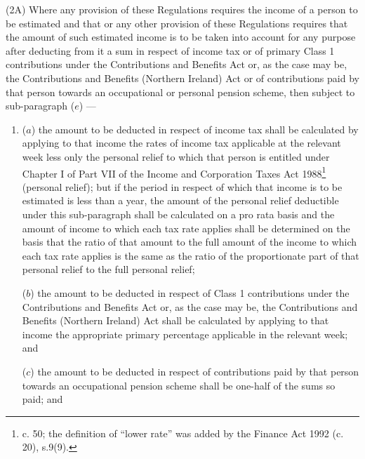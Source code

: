 \documentclass[12pt,a4paper]{article}
\begin{document}
(2A) Where any provision of these Regulations requires the income of a person to be estimated and that or any other provision of these Regulations requires that the amount of such estimated income is to be taken into account for any purpose after deducting from it a sum in respect of income tax or of primary Class 1 contributions under the Contributions and Benefits Act 
or, as the case may be, the Contributions and Benefits (Northern Ireland) Act  %
or of contributions paid by that person towards an occupational or personal pension scheme, then
subject to sub-paragraph ($e$)%
---
\begin{enumerate}\item[]
($a$) the amount to be deducted in respect of income tax shall be calculated by applying to that income the rates of income tax applicable at the 
relevant week  %
less only the personal relief to which that person is entitled under Chapter I of Part VII of the Income and Corporation Taxes Act 1988\footnote{ c. 50; the definition of “lower rate” was added by the Finance Act 1992 (c. 20), s.9(9).} (personal relief); but if the period in respect of which that income is to be estimated is less than a year, the amount of the personal relief deductible under this sub-paragraph shall be calculated on a pro rata basis
and the amount of income to which each tax rate applies shall be determined on the basis that the ratio of that amount to the full amount of the income to which each tax rate applies is the same as the ratio of the proportionate part of that personal relief to the full personal relief;  %

($b$) the amount to be deducted in respect of Class 1 contributions under the Contributions and Benefits Act 
or, as the case may be, the Contributions and Benefits (Northern Ireland) Act  %
shall be calculated by applying to that income the appropriate primary percentage applicable in the relevant week; and

($c$) the amount to be deducted in respect of contributions paid by that person towards an occupational 
pension scheme shall be one-half of the sums so 
paid; and  %


\end{enumerate}
\end{document}
